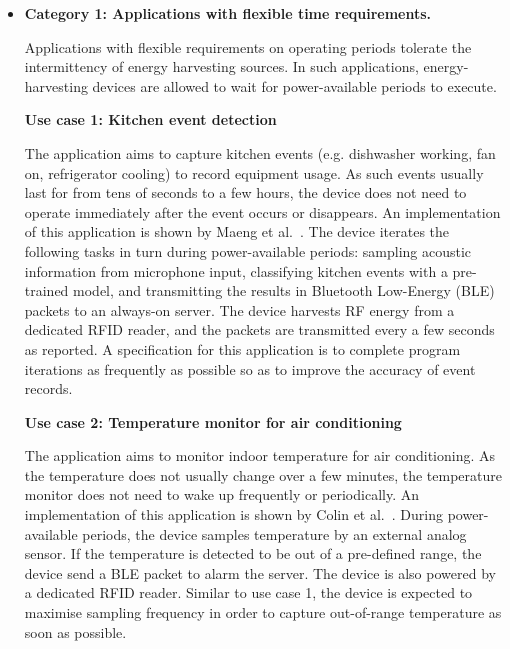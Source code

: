 \begin{itemize}

  \item \textbf{Category 1: Applications with flexible time requirements.}
  
  Applications with flexible requirements on operating periods tolerate the intermittency of energy harvesting sources. In such applications, energy-harvesting devices are allowed to wait for power-available periods to execute.

  \textbf{Use case 1: Kitchen event detection} 
  
  The application aims to capture kitchen events (e.g. dishwasher working, fan on, refrigerator cooling) to record equipment usage. As such events usually last for from tens of seconds to a few hours, the device does not need to operate immediately after the event occurs or disappears. An implementation of this application is shown by Maeng et al.~\cite{maeng2019supporting}. The device iterates the following tasks in turn during power-available periods: sampling acoustic information from microphone input, classifying kitchen events with a pre-trained model, and transmitting the results in Bluetooth Low-Energy (BLE) packets to an always-on server. The device harvests RF energy from a dedicated RFID reader, and the packets are transmitted every a few seconds as reported. A specification for this application is to complete program iterations as frequently as possible so as to improve the accuracy of event records. 

  \hfill

  \textbf{Use case 2: Temperature monitor for air conditioning}

  The application aims to monitor indoor temperature for air conditioning. As the temperature does not usually change over a few minutes, the temperature monitor does not need to wake up frequently or periodically. An implementation of this application is shown by Colin et al.~\cite{colin2018reconfigurable}. During power-available periods, the device samples temperature by an external analog sensor. If the temperature is detected to be out of a pre-defined range, the device send a BLE packet to alarm the server. The device is also powered by a dedicated RFID reader. Similar to use case 1, the device is expected to maximise sampling frequency in order to capture out-of-range temperature as soon as possible.


\end{itemize}

